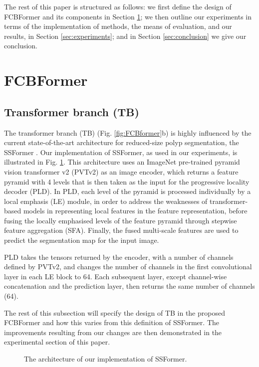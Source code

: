 \documentclass[runningheads]{llncs}
\begin{document}
The rest of this paper is structured as follows: we first define the design of FCBFormer and its components in Section \ref{sec:FCBFormer}; we then outline our experiments in terms of the implementation of methods, the means of evaluation, and our results, in Section \ref{sec:experiments}; and in Section \ref{sec:conclusion} we give our conclusion.

\section{FCBFormer}\label{sec:FCBFormer}
\subsection{Transformer branch (TB)\label{TB}}
The transformer branch (TB) (Fig. \ref{fig:FCBformer}b) is highly influenced by the current state-of-the-art architecture for reduced-size polyp segmentation, the SSFormer \cite{ssformer}. Our implementation of SSFormer, as used in our experiments, is illustrated in Fig. \ref{fig:SSformer}. This architecture uses an ImageNet \cite{imagenet} pre-trained pyramid vision transformer v2 (PVTv2) \cite{pvtv2} as an image encoder, which returns a feature pyramid with 4 levels that is then taken as the input for the progressive locality decoder (PLD). In PLD, each level of the pyramid is processed individually by a local emphasis (LE) module, in order to address the weaknesses of transformer-based models in representing local features in the feature representation, before fusing the locally emphasised levels of the feature pyramid through stepwise feature aggregation (SFA). Finally, the fused multi-scale features are used to predict the segmentation map for the input image.

PLD takes the tensors returned by the encoder, with a number of channels defined by PVTv2, and changes the number of channels in the first convolutional layer in each LE block to 64. Each subsequent layer, except channel-wise concatenation and the prediction layer, then returns the same number of channels (64).

The rest of this subsection will specify the design of TB in the proposed FCBFormer and how this varies from this definition of SSFormer. The improvements resulting from our changes are then demonstrated in the experimental section of this paper.

\begin{figure}[htp]
\caption{The architecture of our implementation of SSFormer.} \label{fig:SSformer}
\end{figure}
\end{document}
